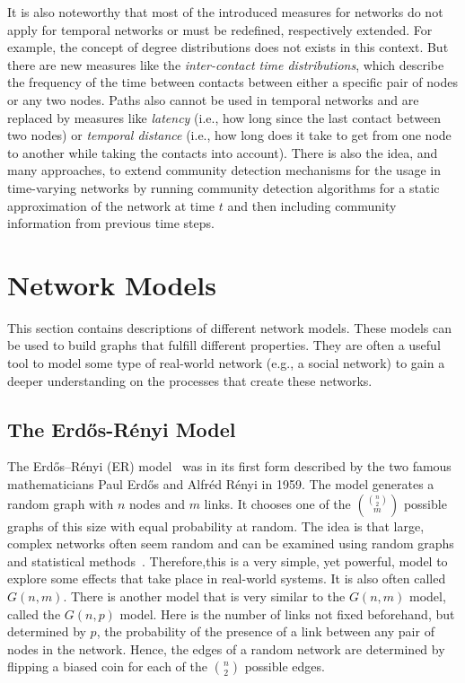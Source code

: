 
It is also noteworthy that most of the introduced measures for networks do not apply for temporal networks or must be redefined, respectively extended.
For example, the concept of degree distributions does not exists in this context.
But there are new measures like the \emph{inter-contact time distributions}, which describe the frequency of the time between contacts between either a specific pair of nodes or any two nodes.
Paths also cannot be used in temporal networks and are replaced by measures like \emph{latency} (i.e., how long since the last contact between two nodes) or \emph{temporal distance} (i.e., how long does it take to get from one node to another while taking the contacts into account).
There is also the idea, and many approaches, to extend community detection mechanisms for the usage in time-varying networks by running community detection algorithms for a static approximation of the network at time \(t\) and then including community information from previous time steps.




\section{Network Models}
\label{sec:network-models}

This section contains descriptions of different network models.
These models can be used to build graphs that fulfill different properties.
They are often a useful tool to model some type of real-world network (e.g., a social network) to gain a deeper understanding on the processes that create these networks.

\subsection{The Erdős-Rényi Model}

The Erdős–Rényi (ER) model~\cite{Erdos1959, Newman2010} was in its first form described by the two famous mathematicians Paul Erdős and Alfréd Rényi in 1959.
The model generates a random graph with \(n\) nodes and \(m\) links.
It chooses one of the \(\binom{\binom{n}{2}}{m}\) possible graphs of this size with equal probability at random.
The idea is that large, complex networks often seem random and can be examined using random graphs and statistical methods~\cite{Barabasi2002}.
Therefore,this is a very simple, yet powerful, model to explore some effects that take place in real-world systems.
It is also often called \(G(n, m)\).
There is another model that is very similar to the \(G(n, m)\) model, called the \(G(n, p)\) model.
Here is the number of links not fixed beforehand, but determined by \(p\), the probability of the presence of a link between any pair of nodes in the network.
Hence, the edges of a random network are determined by flipping a biased coin for each of the \(\binom{n}{2}\) possible edges.

